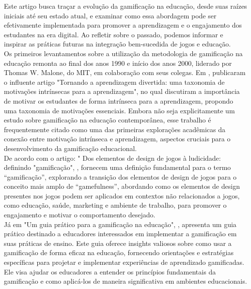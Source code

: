 Este artigo busca traçar a evolução da gamificação na educação, desde suas raízes iniciais até seu estado atual, e examinar como essa abordagem pode ser efetivamente implementada para promover a aprendizagem e o engajamento dos estudantes na era digital. Ao refletir sobre o passado, podemos informar e inspirar as práticas futuras na integração bem-sucedida de jogos e educação.
\\

Os primeiros levantamentos sobre a utilização da metodologia de gamificação na educação remonta ao final dos anos 1990 e início dos anos 2000, liderado por Thomas W. Malone, do MIT, em colaboração com seus colegas. Em \citep{malone2021fazendo}, publicaram o influente artigo "Tornando a aprendizagem divertida: uma taxonomia de motivações intrínsecas para a aprendizagem", no qual discutiram a importância de motivar os estudantes de forma intrínseca para a aprendizagem, propondo uma taxonomia de motivações essenciais. Embora não seja explicitamente um estudo sobre gamificação na educação contemporânea, esse trabalho é frequentemente citado como uma das primeiras explorações acadêmicas da conexão entre motivação intrínseca e aprendizagem, aspectos cruciais para o desenvolvimento da gamificação educacional.
\\

De acordo com o artigo: " Dos elementos de design de jogos à ludicidade: definindo "gamificação", \citep{deterding2011game}, fornecem uma definição fundamental para o termo “gamificação”, explorando a transição dos elementos de design de jogos para o conceito mais amplo de “gamefulness”, abordando como os elementos de design presentes nos jogos podem ser aplicados em contextos não relacionados a jogos, como educação, saúde, marketing e ambiente de trabalho, para promover o engajamento e motivar o comportamento desejado.
\\

Já em "Um guia prático para a gamificação na educação", \citep{hsin2013practitioner}, apresenta um guia prático destinado a educadores interessados em implementar a gamificação em suas práticas de ensino. Este guia oferece insights valiosos sobre como usar a gamificação de forma eficaz na educação, fornecendo orientações e estratégias específicas para projetar e implementar experiências de aprendizado gamificadas. Ele visa ajudar os educadores a entender os princípios fundamentais da gamificação e como aplicá-los de maneira significativa em ambientes educacionais. 
\\

